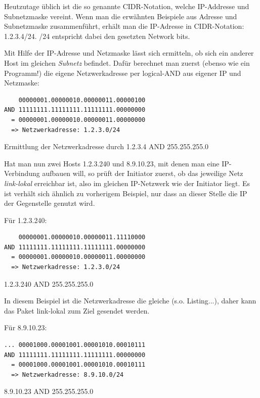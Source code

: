 Heutzutage üblich ist die so genannte CIDR-Notation, welche IP-Addresse und Subnetzmaske vereint. Wenn man die erwähnten Beispiele aus Adresse und Subnetzmaske zusammenführt, erhält man die IP-Adresse in CIDR-Notation: 1.2.3.4/24. /24 entspricht dabei den gesetzten Network bits.

Mit Hilfe der IP-Adresse und Netzmaske lässt sich ermitteln, ob sich ein anderer Host im gleichen \textit{Subnetz} befindet. Dafür berechnet man zuerst (ebenso wie ein Programm!) die eigene Netzwerkadresse per logical-AND aus eigener IP und Netzmaske:

\begin{listing}[h]
\begin{verbatim}
    00000001.00000010.00000011.00000100
AND 11111111.11111111.11111111.00000000
  = 00000001.00000010.00000011.00000000
  => Netzwerkadresse: 1.2.3.0/24
\end{verbatim}
\label{own-ip-address-AND-subnet}
\caption{Ermittlung der Netzwerkadresse durch 1.2.3.4 AND 255.255.255.0}
\end{listing}
    
Hat man nun zwei Hosts 1.2.3.240 und 8.9.10.23, mit denen man eine IP-Verbindung aufbauen will, so prüft der Initiator zuerst, ob das jeweilige Netz \textit{link-lokal} erreichbar ist, also im gleichen IP-Netzwerk wie der Initiator liegt. Es ist verhält sich ähnlich zu vorherigem Beispiel, nur dass an dieser Stelle die IP der Gegenstelle genutzt wird.

Für 1.2.3.240:

\begin{listing}[h]
\begin{verbatim}
    00000001.00000010.00000011.11110000
AND 11111111.11111111.11111111.00000000
  = 00000001.00000010.00000011.00000000
  => Netzwerkadresse: 1.2.3.0/24
\end{verbatim}
\label{local-ip-address-AND-subnet}
\caption{1.2.3.240 AND 255.255.255.0}
\end{listing}

In diesem Beispiel ist die Netzwerkadresse die gleiche (s.o. Listing...), daher kann das Paket link-lokal zum Ziel gesendet werden.

Für 8.9.10.23:

\begin{listing}[h]
\begin{verbatim}
... 00001000.00001001.00001010.00010111
AND 11111111.11111111.11111111.00000000
  = 00001000.00001001.00001010.00010111
  => Netzwerkadresse: 8.9.10.0/24
\end{verbatim}
\label{remote-ip-address-AND-subnet}
\caption{8.9.10.23 AND 255.255.255.0}
\end{listing}

